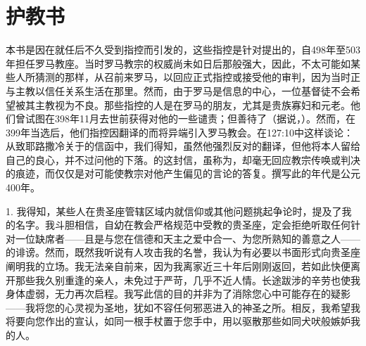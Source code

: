 
\chapter{护教书}


\par

本书是因在就任后不久受到指控而引发的，这些指控是针对提出的，自498年至503年担任罗马教座。当时罗马教宗的权威尚未如日后那般强大，因此，不太可能如某些人所猜测的那样，从召前来罗马，以回应正式指控或接受他的审判，因为当时正与主教以信任关系生活在那里。然而，由于罗马是信息的中心，一位基督徒不会希望被其主教视为不良。那些指控的人是在罗马的朋友，尤其是贵族寡妇和元老。他们曾试图在398年11月去世前获得对他的一些谴责；但善待了（据说，）。然而，在399年当选后，他们指控因翻译的而将异端引入罗马教会。在127:10中这样谈论：从致耶路撒冷关于的信函中，我们得知，虽然他强烈反对的翻译，但他将本人留给自己的良心，并不过问他的下落。的这封信，虽称为，却毫无回应教宗传唤或判决的痕迹，而仅仅是对可能使教宗对他产生偏见的言论的答复。撰写此的年代是公元400年。\par

1. 我得知，某些人在贵圣座管辖区域内就信仰或其他问题挑起争论时，提及了我的名字。我斗胆相信，自幼在教会严格规范中受教的贵圣座，定会拒绝听取任何针对一位缺席者——且是与您在信德和天主之爱中合一、为您所熟知的善意之人——的诽谤。然而，既然我听说有人攻击我的名誉，我认为有必要以书面形式向贵圣座阐明我的立场。我无法亲自前来，因为我离家近三十年后刚刚返回，若如此快便离开那些我久别重逢的亲人，未免过于严苛，几乎不近人情。长途跋涉的辛劳也使我身体虚弱，无力再次启程。我写此信的目的并非为了消除您心中可能存在的疑影——我将您的心灵视为圣地，犹如不容任何邪恶进入的神圣之所。相反，我希望我将要向您作出的宣认，如同一根手杖置于您手中，用以驱散那些如同犬吠般嫉妒我的人。\par

